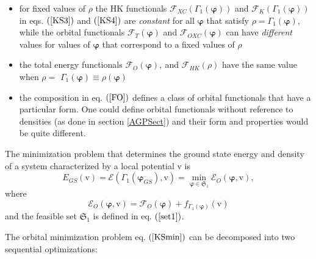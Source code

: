 \documentclass[aps,preprint]{revtex4}%
\begin{document}
\begin{itemize}
\item for fixed values of $\rho$ the HK functionals $\mathcal{F}_{XC}\left(
\Gamma_{1}\left(  \boldsymbol{\varphi}\right)  \right)  $ and $\mathcal{F}%
_{K}\left(  \Gamma_{1}\left(  \boldsymbol{\varphi}\right)  \right)  $ in eqs.
$\left(  \ref{KS3}\right)  $ and $\left(  \ref{KS4}\right)  $ are
\emph{constant} for all $\boldsymbol{\varphi}$ that satisfy $\rho=\Gamma
_{1}\left(  \boldsymbol{\varphi}\right)  $, while the orbital functionals
$\mathcal{F}_{T}\left(  \boldsymbol{\varphi}\right)  $ and $\mathcal{F}%
_{OXC}\left(  \boldsymbol{\varphi}\right)  $ can have \emph{different} values
for values of $\boldsymbol{\varphi}$ that correspond to a fixed values of
$\rho$

\item the total energy functionals $\mathcal{F}_{O}\left(  \boldsymbol{\varphi
}\right)  ,\mathcal{\ }$and $\mathcal{F}_{HK}\left(  \rho\right)  $ have the
same value when $\rho=$ $\Gamma_{1}\left(  \boldsymbol{\varphi}\right)
\equiv\rho\left(  \boldsymbol{\varphi}\right)  $

\item the composition in eq. $\left(  \ref{FO}\right)  $ defines a class of
orbital functionals that have a particular form. One could define orbital
functionals without reference to densities (as done in section \ref{AGPSect})
and their form and properties would be quite different.
\end{itemize}

The minimization problem that determines the ground state energy and density
of a system characterized by a local potential $\mathrm{v}$ is
\begin{equation}
E_{GS}\left(  \mathrm{v}\right)  =\mathcal{E}\left(  \Gamma_{1}\left(
\boldsymbol{\varphi}_{GS}\right)  \boldsymbol{,}\mathrm{v}\right)
=\min_{\boldsymbol{\varphi\in}\mathfrak{S}_{1}}\mathcal{E}_{O}\left(
\boldsymbol{\varphi,}\mathrm{v}\right)  , \label{KSmin}%
\end{equation}
where
\begin{equation}
\mathcal{E}_{O}\left(  \boldsymbol{\varphi,}\mathrm{v}\right)  =\mathcal{F}%
_{O}\left(  \boldsymbol{\varphi}\right)  +f_{\Gamma_{1}\left(
\boldsymbol{\varphi}\right)  }\left(  \mathrm{v}\right)
\end{equation}
and the feasible set $\mathfrak{S}_{1}$ is defined in eq. $\left(
\ref{set1}\right)  $.

The orbital minimization problem eq. $\left(  \ref{KSmin}\right)  $ can be
decomposed into two sequential optimizations:
\end{document}
